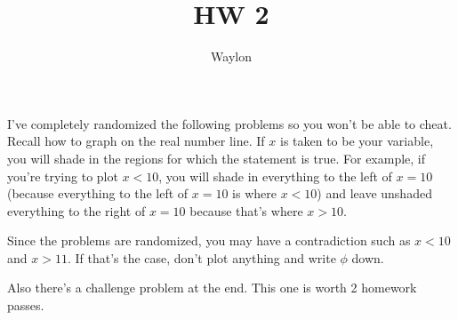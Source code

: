 \documentclass[12pt]{article}
\begin{document}
			\title{HW 2}
			\author{Waylon}
			\date{}
			\maketitle
I've completely randomized the following problems so you won't be able to cheat. Recall how to 
graph on the real number line. If $x$ is taken
to be your variable, you will shade in the regions for which the statement is true. For example, if you're
trying to plot $x < 10$, you will shade in everything to the left of $x = 10$ (because everything to the 
left of $x = 10$ is where $x < 10$) and leave unshaded everything to the right of $x = 10$ because that's where
$x > 10$.

Since the problems are randomized, you may have a contradiction such as $x < 10$ and $x > 11$. If that's the case,
don't plot anything and write $\phi$ down.

Also there's a challenge problem at the end. This one is worth 2 homework passes.
\end{document}
